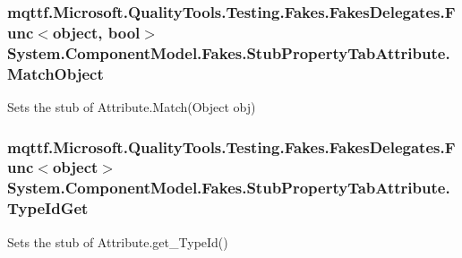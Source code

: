 \hypertarget{class_system_1_1_component_model_1_1_fakes_1_1_stub_property_tab_attribute_a543e1be935189ffbb330a8296af04cb9}{
\subsubsection[{Match\-Object}]{\setlength{\rightskip}{0pt plus 5cm}mqttf.\-Microsoft.\-Quality\-Tools.\-Testing.\-Fakes.\-Fakes\-Delegates.\-Func$<$object, bool$>$ System.\-Component\-Model.\-Fakes.\-Stub\-Property\-Tab\-Attribute.\-Match\-Object}}\label{class_system_1_1_component_model_1_1_fakes_1_1_stub_property_tab_attribute_a543e1be935189ffbb330a8296af04cb9}


Sets the stub of Attribute.\-Match(\-Object obj)

\hypertarget{class_system_1_1_component_model_1_1_fakes_1_1_stub_property_tab_attribute_a605a986262376bc414df8996f6a6cbc3}{
\subsubsection[{Type\-Id\-Get}]{\setlength{\rightskip}{0pt plus 5cm}mqttf.\-Microsoft.\-Quality\-Tools.\-Testing.\-Fakes.\-Fakes\-Delegates.\-Func$<$object$>$ System.\-Component\-Model.\-Fakes.\-Stub\-Property\-Tab\-Attribute.\-Type\-Id\-Get}}\label{class_system_1_1_component_model_1_1_fakes_1_1_stub_property_tab_attribute_a605a986262376bc414df8996f6a6cbc3}


Sets the stub of Attribute.\-get\-\_\-\-Type\-Id()



